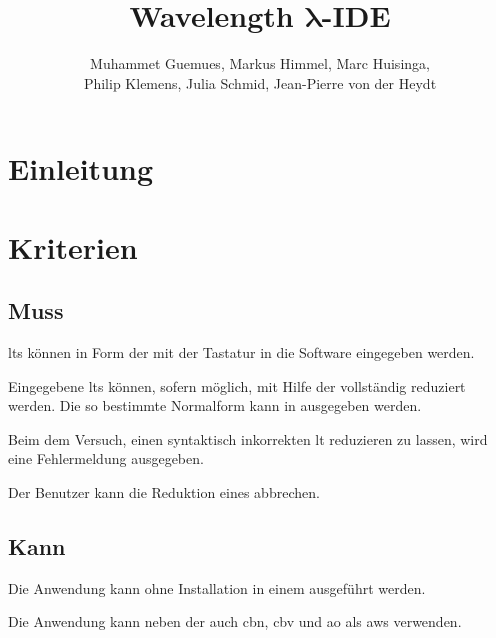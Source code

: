 \documentclass[parskip=full,11pt,twoside]{scrartcl}
\title{Wavelength $\bm{\lambda}$-IDE}
\author{Muhammet Guemues, Markus Himmel, Marc Huisinga,\\Philip Klemens, Julia Schmid, Jean-Pierre von der Heydt}
\begin{document}
\maketitle

\section{Einleitung}


\pagebreak
\section{Kriterien}

\subsection{Muss}

\glspl{lt} können in Form der 
mit der Tastatur in die Software eingegeben werden.

Eingegebene \glspl{lt} können, sofern möglich, mit Hilfe der  vollständig
reduziert werden. Die so bestimmte Normalform kann in 
ausgegeben werden.

Beim dem Versuch, einen syntaktisch inkorrekten \gls{lt} reduzieren zu lassen, wird eine
Fehlermeldung ausgegeben.

Der Benutzer kann die Reduktion eines  abbrechen.


\subsection{Kann}
Die Anwendung kann ohne Installation in einem  ausgeführt werden.

Die Anwendung kann neben der  auch \gls{cbn}, \gls{cbv}
und \gls{ao} als \gls{aws} verwenden.
\end{document}
